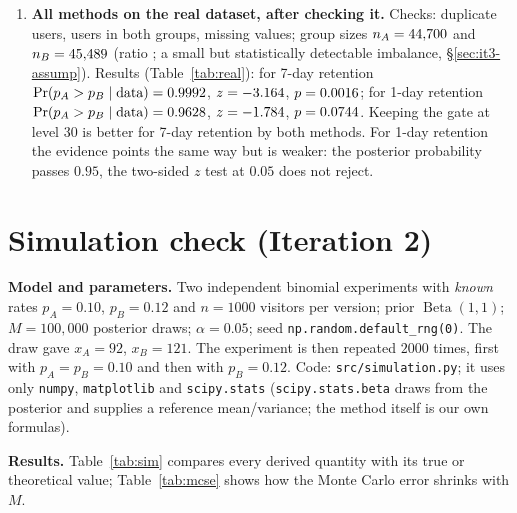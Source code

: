 \documentclass[11pt]{article}
\theoremstyle{definition}
\theoremstyle{remark}
\renewcommand{\Pr}{\operatorname{Pr}}
\newcommand{\Betad}{\operatorname{Beta}}
\newcommand{\data}{\text{data}}
\newcommand{\simxA}{92}\newcommand{\simxB}{121}\newcommand{\simn}{1000}\newcommand{\simM}{100{,}000}}
\begin{document}
\begin{enumerate}[label=\textbf{Q\arabic*.},leftmargin=*]
\item \textbf{All methods on the real dataset, after checking it.}
  Checks: \realDup{} duplicate users, \realBoth{} users in both groups, \realMissing{} missing values; group sizes
  $n_A=44{,}700$ and $n_B=45{,}489$ (ratio \realRatio; a small but statistically detectable imbalance,
  \S\ref{sec:it3-assump}). Results (Table~\ref{tab:real}): for 7-day retention $\Pr(p_A>p_B\mid\data)=\realSevenThetaA$,
  $z=-3.164$, $p=0.0016$; for 1-day retention $\Pr(p_A>p_B\mid\data)=\realOneThetaA$, $z=-1.784$,
  $p=0.0744$. Keeping the gate at level 30 is better for 7-day retention by both methods. For 1-day retention the
  evidence points the same way but is weaker: the posterior probability passes $0.95$, the two-sided $z$ test at
  $0.05$ does not reject.
\end{enumerate}

\clearpage
\section{Simulation check (Iteration 2)}\label{sec:sim}

\textbf{Model and parameters.} Two independent binomial experiments with \emph{known} rates
$p_A=0.10$, $p_B=0.12$ and $n=\simn$ visitors per version; prior $\Betad(1,1)$; $M=\simM$ posterior draws;
$\alpha=0.05$; seed \texttt{np.random.default\_rng(0)}. The draw gave $x_A=\simxA$, $x_B=\simxB$.
The experiment is then repeated $2000$ times, first with $p_A=p_B=0.10$ and then with $p_B=0.12$.
Code: \texttt{src/simulation.py}; it uses only \texttt{numpy}, \texttt{matplotlib} and \texttt{scipy.stats}
(\texttt{scipy.stats.beta} draws from the posterior and supplies a reference mean/variance; the method itself
is our own formulas).

\textbf{Results.} Table~\ref{tab:sim} compares every derived quantity with its true or theoretical value;
Table~\ref{tab:mcse} shows how the Monte Carlo error shrinks with $M$.
\end{document}
